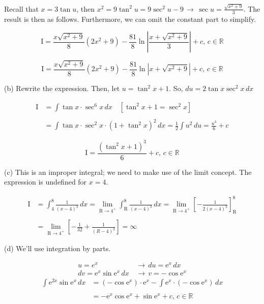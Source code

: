 \documentclass{article}
\begin{document}
\hfill

\noindent Recall that $x=3\tan u$, then $\displaystyle x^2 = 9\tan^2u = 9\sec^2u-9\,\rightarrow\, \sec u =\frac{\sqrt{x^2+9}}3$. The result is then as follows. Furthermore, we can omit the constant part to simplify.

\begin{equation*}
\mathrm{I}=\frac{x\sqrt{x^2+9}}8\left(2x^2+9\right)-\frac{81}8\ln\left|\frac{x+\sqrt{x^2+9}}3\right| + c,\,c\in\mathbb{R}
\end{equation*}

\begin{equation*}
\boxed{\mathrm{I}=\frac{x\sqrt{x^2+9}}8\left(2x^2+9\right)-\frac{81}8\ln\left|x+\sqrt{x^2+9}\right| + c,\,c\in\mathbb{R}}
\end{equation*}

\newpage

\noindent (b) Rewrite the expression. Then, let $u =\tan^2x + 1$. So, $du=2\tan x \sec^2 x\,dx$

\begin{align*}
\mathrm{I} &=\int\tan x \cdot\sec^6 x\, dx \quad\left[\tan^2x+1=\sec^2x\right] \\\\ &= \int\tan x\cdot\sec^2x\cdot(1+\tan^2x)^2 \,dx=\frac12\int u^2 \,du  = \frac{u^3}6 + c
\end{align*}

\begin{equation*}
\boxed{\mathrm{I}=\frac{(\tan^2x+1)^3}{6} + c, \, c\in \mathbb{R}}
\end{equation*}

\noindent (c) This is an improper integral; we need to make use of the limit concept. The expression is undefined for $x=4$.

\begin{align*}
\mathrm{I} &= \int_4^8\frac1{(x-4)^3}\,dx = \lim_{\mathrm{R}\to4^+}\int_\mathrm{R}^8\frac1{(x-4)^3}\,dx=\lim_{\mathrm{R}\to4^+} \left[-\frac1{2(x-4)^2}\right]_\mathrm{R}^8\\\\&=\lim_{\mathrm{R}\to4^+} \left[-\frac1{32} + \frac1{(R-4)^2}\right]=\boxed\infty
\end{align*}

\hfill

\noindent (d) We'll use integration by parts.

\begin{align*}u=e^x\,&\rightarrow\,du=\mathrm{e}^x\,dx \\dv=\mathrm{e}^x\sin \mathrm{e}^x \,dx \,&\rightarrow\,v=-\cos\mathrm{e}^x\end{align*}
\begin{align*}\int\mathrm{e}^{2x}\sin\mathrm{e}^x\,dx&=(-\cos\mathrm{e}^x)\cdot\mathrm{e}^x-\int\mathrm{e}^x\cdot(-\cos\mathrm{e}^x)\,dx\\\\&=\boxed{-\mathrm{e}^x\cos \mathrm{e}^x +\sin \mathrm{e}^x + c, \,c \in \mathbb{R}} \end{align*}
\end{document}
